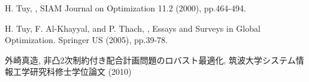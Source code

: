 \documentclass[a4paper,11pt]{jreport}
\begin{document}
\begin{thebibliography}{1}
H. Tuy,
,
\newblock SIAM Journal on Optimization 11.2 (2000), pp.464-494.

H. Tuy, F. Al-Khayyal, and P. Thach,
,
\newblock Essays and Surveys in Global Optimization. Springer US (2005), pp.39-78.

外崎真造,
\newblock 非凸2次制約付き配合計画問題のロバスト最適化,
\newblock 筑波大学システム情報工学研究科修士学位論文 (2010)

\end{thebibliography}
\end{document}
